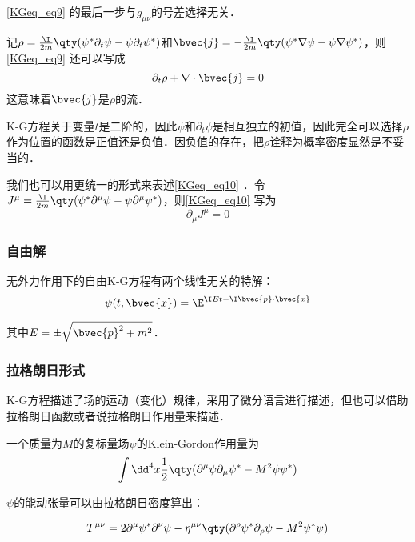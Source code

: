 \autoref{KGeq_eq9} 的最后一步与$g_{\mu\nu}$的号差选择无关．

记$\rho=\frac{\I}{2m}\qty(\psi^*\partial_t\psi-\psi\partial_t\psi^*)$和$\bvec{j}=-\frac{\I}{2m}\qty(\psi^*\nabla\psi-\psi\nabla\psi^*)$，则\autoref{KGeq_eq9} 还可以写成
\begin{equation}\label{KGeq_eq10}
\partial_t\rho+\nabla\cdot\bvec{j} = 0
\end{equation}
这意味着$\bvec{j}$是$\rho$的流．

K-G方程关于变量$t$是二阶的，因此$\psi$和$\partial_t\psi$是相互独立的初值，因此完全可以选择$\rho$作为位置的函数是正值还是负值．因负值的存在，把$\rho$诠释为概率密度显然是不妥当的．

我们也可以用更统一的形式来表述\autoref{KGeq_eq10} ．令$J^\mu=\frac{\I}{2m}\qty(\psi^*\partial^\mu\psi-\psi\partial^\mu\psi^*)$，则\autoref{KGeq_eq10} 写为
\begin{equation}
\partial_\mu J^\mu = 0
\end{equation}



\subsubsection{自由解}

无外力作用下的自由K-G方程有两个线性无关的特解：
\begin{equation}
\psi(t, \bvec{x}) = \E^{\I Et-\I \bvec{p}\cdot\bvec{x}}
\end{equation}

其中$E=\pm\sqrt{\bvec{p}^2+m^2}$．





\subsubsection{拉格朗日形式}


K-G方程描述了场的运动（变化）规律，采用了微分语言进行描述，但也可以借助拉格朗日函数或者说拉格朗日作用量来描述．

一个质量为$M$的复标量场$\psi$的Klein-Gordon作用量为
\begin{equation}
\int {\dd}^4 x \frac{1}{2}\qty(\partial^\mu\psi\partial_\mu\psi^*-M^2\psi\psi^*)
\end{equation}

$\psi$的能动张量可以由拉格朗日密度算出：

\begin{equation}
T^{\mu\nu} = 2\partial^\mu\psi^*\partial^\nu\psi-\eta^{\mu\nu}\qty(\partial^\rho\psi^*\partial_\rho\psi-M^2\psi^*\psi)
\end{equation}


